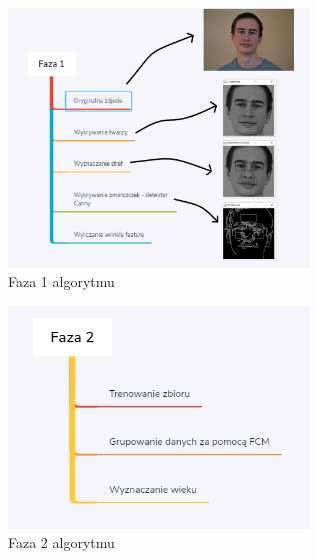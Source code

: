 \documentclass[a4paper,twoside,12pt]{book}
\begin{document}
    \begin{figure}[h]
        \centering
        \includegraphics[width=8cm]{Obrazy/Faza1.jpg}
        \caption{Faza 1 algorytmu}
        \label{fig.faza1Algorytmu}
    \end{figure}

    \begin{figure}[h]
        \centering
        \includegraphics[width=8cm]{Obrazy/Faza2.jpg}
        \caption{Faza 2 algorytmu}
        \label{fig.faza2Algorytmu}
    \end{figure}
\end{document}
